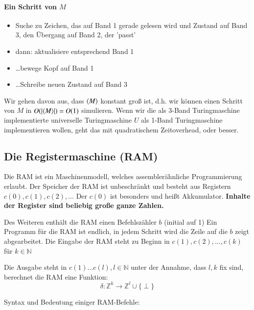 \paragraph*{Ein Schritt von $M$}
\begin{itemize}
	\item Suche zu Zeichen, das auf Band 1 gerade gelesen wird und Zustand auf Band 3, den Übergang auf Band 2, der 'passt'
	\item dann: aktualisiere entsprechend Band 1
	\item \dots bewege Kopf auf Band 1
	\item \dots Schreibe neuen Zustand auf Band 3
\end{itemize}

Wir gehen davon aus, dass $\langle M \rangle$ konstant groß ist, d.h. wir können einen Schritt von $M$ in $O(|\langle M \rangle|)=O(1)$ simulieren. Wenn wir die als 3-Band Turingmaschine implementierte universelle Turingmaschine $U$ als 1-Band Turingmaschine implementieren wollen, geht das mit quadratischem Zeitoverhead, oder besser.

\subsection{Die Registermaschine (RAM)}
Die RAM ist ein Maschinenmodell, welches assemblerähnliche Programmierung erlaubt. Der Speicher der RAM ist unbeschränkt und besteht aus Registern $c(0),c(1),c(2),\dots$ Der $c(0)$ ist besonders und heißt Akkumulator. \textbf{Inhalte der Register sind beliebig große ganze Zahlen.}

\par\medskip
Des Weiteren enthält die RAM einen Befehlszähler $b$ (initial auf 1) %
Ein Programm für die RAM ist endlich, in jedem Schritt wird die Zeile auf die $b$ zeigt abgearbeitet. Die Eingabe der RAM steht zu Beginn in $c(1),c(2),\dots,c(k)$ für $k \in \mathbb{N}$\par\medskip

Die Ausgabe steht in $c(1)\dots c(l), l \in \mathbb{N}$ unter der Annahme, dass $l,k$ fix sind, berechnet die RAM eine Funktion: $$\delta:\mathbb{Z}^k \rightarrow \mathbb{Z}^l \cup \{ \perp \}$$
\par\medskip

\newpage

Syntax und Bedeutung einiger RAM-Befehle:\par\medskip

